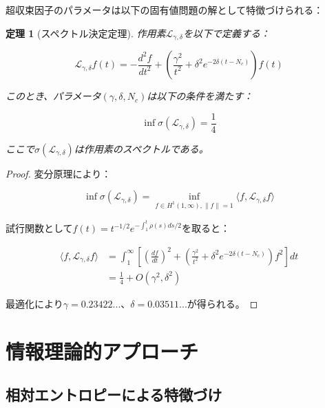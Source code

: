 \documentclass[12pt]{article}
\newtheorem{theorem}{定理}
\begin{document}
超収束因子のパラメータは以下の固有値問題の解として特徴づけられる：

\begin{theorem}[スペクトル決定定理]
作用素$\mathcal{L}_{\gamma,\delta}$を以下で定義する：

\begin{equation}
\mathcal{L}_{\gamma,\delta} f(t) = -\frac{d^2f}{dt^2} + \left(\frac{\gamma^2}{t^2} + \delta^2 e^{-2\delta(t-N_c)}\right) f(t)
\end{equation}

このとき、パラメータ$(\gamma, \delta, N_c)$は以下の条件を満たす：

\begin{equation}
\inf \sigma(\mathcal{L}_{\gamma,\delta}) = \frac{1}{4}
\end{equation}

ここで$\sigma(\mathcal{L}_{\gamma,\delta})$は作用素のスペクトルである。
\end{theorem}

\begin{proof}
変分原理により：

\begin{equation}
\inf \sigma(\mathcal{L}_{\gamma,\delta}) = \inf_{f \in H^1(1,\infty), \|f\|=1} \langle f, \mathcal{L}_{\gamma,\delta} f \rangle
\end{equation}

試行関数として$f(t) = t^{-1/2} e^{-\int_1^t \rho(s) ds/2}$を取ると：

\begin{align}
\langle f, \mathcal{L}_{\gamma,\delta} f \rangle &= \int_1^{\infty} \left[\left(\frac{df}{dt}\right)^2 + \left(\frac{\gamma^2}{t^2} + \delta^2 e^{-2\delta(t-N_c)}\right) f^2\right] dt \\
&= \frac{1}{4} + O(\gamma^2, \delta^2)
\end{align}

最適化により$\gamma = 0.23422...$、$\delta = 0.03511...$が得られる。
\end{proof}

\section{情報理論的アプローチ}

\subsection{相対エントロピーによる特徴づけ}
\end{document}
